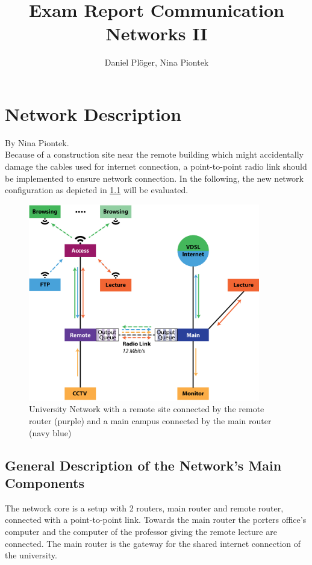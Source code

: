 \documentclass[a4paper,10pt]{book}\usepackage{graphicx}
\title{Exam Report Communication Networks II}
\author{Daniel Plöger, Nina Piontek}
\begin{document}
\maketitle
\tableofcontents



\chapter{Network Description}
By Nina Piontek.\\

Because of a construction site near the remote building which might accidentally damage the cables 
used for internet connection,
a point-to-point radio link should be implemented to ensure network connection.
In the following, the new network configuration as depicted in \ref{fig:network} will be evaluated.
\begin{figure}[!ht]
  \begin{center}
    \includegraphics[width=0.9\textwidth]{graphics-03.eps}
    \caption{University Network with a remote site connected by the remote router (purple) and a main campus connected by the main router (navy blue)}
    \label{fig:network}
  \end{center}
\end{figure}

\section{General Description of the Network's Main Components}

The network core is a setup with 2 routers, main router and remote router, connected with a point-to-point link. 
Towards the main router the porters office's computer and the computer of the professor giving the remote lecture are connected.
The main router is the gateway for the shared internet connection of the university.
\end{document}
